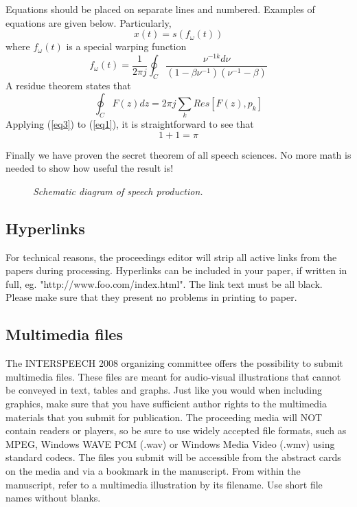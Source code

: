 \documentclass{article}
\begin{document}
Equations should be placed on separate lines and numbered. Examples 
of equations are given below.
Particularly,
%
\begin{equation}
x(t) = s(f_\omega(t))
\label{eq1}
\end{equation}
where \(f_\omega(t)\) is a special warping function
\begin{equation}
f_\omega(t)=\frac{1}{2\pi j}\oint_C \frac{\nu^{-1k}d\nu}
{(1-\beta\nu^{-1})(\nu^{-1}-\beta)}
\label{eq2}
\end{equation}
A residue theorem states that
\begin{equation}
\oint_C F(z)dz=2 \pi j \sum_k Res[F(z),p_k]
\label{eq3}
\end{equation}
Applying (\ref{eq3}) to (\ref{eq1}), 
it is straightforward to see that
\begin{equation}
1 + 1 = \pi
\label{eq4}
\end{equation}

Finally we have proven the secret theorem of all speech sciences. 
No more math is needed to show how useful the result is! 

\begin{figure}[t]
\centerline{}
\caption{{\it Schematic diagram of speech production.}}  
\label{spprod}
\end{figure}

\subsection{Hyperlinks}

For technical reasons, the proceedings editor will strip all active
links from the papers during processing. Hyperlinks can be included in
your paper, if written in full, eg. "http://www.foo.com/index.html".
The link text must be all black. Please make sure that they present no
problems in printing to paper.

\subsection{Multimedia files}

The INTERSPEECH 2008 organizing committee offers the possibility to submit
multimedia files. These files are meant for audio-visual illustrations that
cannot be conveyed in text, tables and graphs. Just like you would when
including graphics, make sure that you have sufficient author rights to the
multimedia materials that you submit for publication. The proceeding media
will NOT contain readers or players, so be sure to use widely accepted file
formats, such as MPEG, Windows WAVE PCM (.wav) or Windows Media Video
(.wmv) using standard codecs. The files you submit will be accessible from
the abstract cards on the media and via a bookmark in the manuscript. From
within the manuscript, refer to a multimedia illustration by its filename.
Use short file names without blanks.
\end{document}
